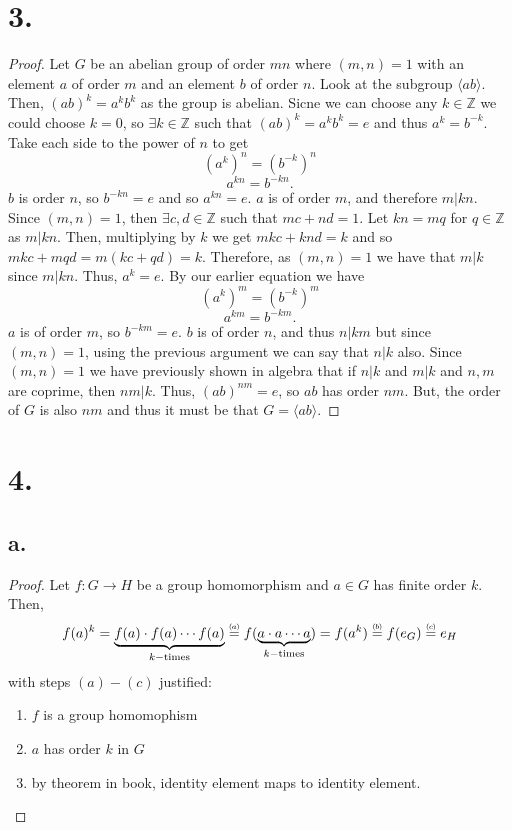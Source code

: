 \documentclass{article}
\newcommand\numeq[1]%
  {\stackrel{\scriptscriptstyle(\mkern-1.5mu#1\mkern-1.5mu)}{=}}
\begin{document}
\section*{3.}
\begin{proof}
  Let $G$ be an abelian group of order $mn$ where $(m, n) = 1$ with an element $a$ of order $m$ and an element $b$ of order $n$. Look at the subgroup $\langle ab \rangle$. Then, $(ab)^k = a^kb^k$ as the group is abelian. Sicne we can choose any $k \in \mathbb{Z}$ we could choose $k = 0$, so $\exists k \in \mathbb{Z}$ such that $(ab)^k = a^kb^k = e$ and thus $a^k = b^{-k}$. Take each side to the power of $n$ to get 
  \[
  \left(a^k\right)^n = \left(b^{-k} \right)^n  
  \] 
  \[
  a^{kn} = b^{-kn}.  
  \]
  $b$ is order $n$, so $b^{-kn} = e$ and so $a^{kn} = e$. $a$ is of order $m$, and therefore $m|kn$. Since $(m, n) = 1$, then $\exists c,d \in \mathbb{Z}$ such that $mc + nd = 1$. Let $kn = mq$ for $q \in \mathbb{Z}$ as $m|kn$. Then, multiplying by $k$ we get $mkc + knd = k$ and so $mkc + mqd = m(kc + qd) = k$. Therefore, as $(m, n) = 1$ we have that $m|k$ since $m|kn$. Thus, $a^k = e$. By our earlier equation we have 
  \[
  (a^k)^m = (b^{-k})^m  
  \]
  \[
  a^{km} = b^{-km}.
  \]
  $a$ is of order $m$, so $b^{-km} = e$. $b$ is of order $n$, and thus $n|km$ but since $(m, n) = 1$, using the previous argument we can say that $n|k$ also. Since $(m, n) = 1$ we have previously shown in algebra that if $n|k$ and $m|k$ and $n, m$ are coprime, then $nm|k$. Thus, $(ab)^{nm} = e$, so $ab$ has order $nm$. But, the order of $G$ is also $nm$ and thus it must be that $G = \langle ab \rangle$. 
\end{proof}
\section*{4.}
\subsection*{a.}
\begin{proof}
  Let $f:G \to H$ be a group homomorphism and $a \in G$ has finite order $k$. Then, 
  \[
  f(a)^k = \underbrace{f(a)\cdot f(a) \cdots f(a)}_{k-\text{times}} \numeq{a} f(\underbrace{a \cdot a \cdots a}_{k-\text{times}}) = f(a^k) \numeq{b} f(e_G) \numeq{c} e_H   
  \] 
  with steps $(a) -(c)$ justified:
  \begin{enumerate}[\indent (a)]
   \item $f$ is a group homomophism
   \item $a$ has order $k$ in $G$
   \item by theorem in book, identity element maps to identity element.  
  \end{enumerate} 
\end{proof}
\end{document}
